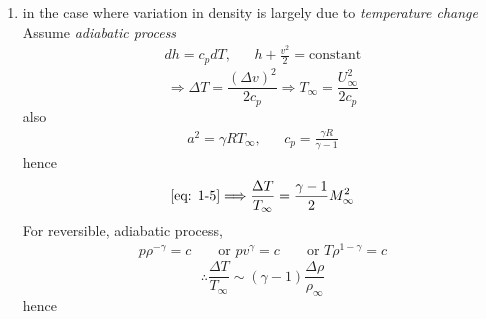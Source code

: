 \begin{itemize}
\begin{enumerate}[label = <\roman*>]
\begin{enumerate}[label = (\alph*)]
\begin{enumerate}[label = \protect\circled{\arabic*}]
\begin{align*}
a = \sqrt{\left.\frac{\partial p}{\partial \rho}\right|_s} = \sqrt{\gamma RT},&& \gamma = \frac{c_p}{c_v}
\end{align*}
\begin{align*}
\therefore a^2 = \gamma RT = \gamma\frac{p}{\rho}, && \boxed{M_\infty = \frac{U_\infty}{a}}\textrm{ (Mach number)}
\end{align*}
\begin{equation}
\Longrightarrow \frac{U_\infty^2}{p/\rho} = \gamma M_\infty^2
\label{eq: 1-2}
\end{equation}
substitute \eqref{eq: 1-2} into \eqref{eq: 1-1}
\begin{equation}
\Longrightarrow \frac{\Delta p}{p}\sim \frac{\gamma}{2}M_\infty^2
\label{eq: 1-3}
\end{equation}
use $p = \rho RT$, take $T\approx$constant,
\begin{equation}
\Longrightarrow\frac{\Delta p}{p}\sim\frac{\Delta\rho}{rho}\Longrightarrow\boxed{\frac{\Delta\rho}{\rho}\sim\frac{\gamma}{2}M_\infty^2}
\label{eq: 1-4}
\end{equation}
For most gases, $\gamma\approx 1$, hence $\Delta\rho/\rho <5\%$ if $\underline{M_\infty <0.3}$.
\item in the case where variation in density is largely due to \emph{temperature change}\label{1.1-2}\\
Assume \emph{adiabatic process}
\begin{align*}
dh = c_pdT, && h + \frac{v^2}{2} = \textrm{constant}
\end{align*}
\begin{equation}
\Longrightarrow\Delta T = \frac{\left(\Delta v\right)^2}{2c_p}\Longrightarrow T_\infty = \frac{U_\infty^2}{2c_p}
\label{eq: 1-5}
\end{equation}
also
\begin{align*}
a^2 = \gamma R T_\infty, && c_p = \frac{\gamma R}{\gamma - 1}
\end{align*}
hence 
\begin{equation}
\eqref{eq: 1-5}\Longrightarrow \frac{\Delta T}{T_\infty} = \frac{\gamma -1}{2}M_\infty^2
\label{eq: 1-6}
\end{equation}
For reversible, adiabatic process,
\begin{align*}
p\rho^{-\gamma} = c && \text{ or }pv^\gamma = c && \text{ or }T\rho^{1-\gamma} = c
\end{align*}
\[
\therefore\frac{\Delta T}{T_\infty}\sim\left(\gamma-1\right)\frac{\Delta\rho}{\rho_\infty}
\]
hence
\begin{equation}

\end{equation}
\end{enumerate}
\end{enumerate}
\end{enumerate}
\end{itemize}
